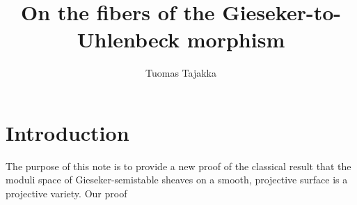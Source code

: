 \documentclass[letterpaper,10pt]{article}
\title{On the fibers of the Gieseker-to-Uhlenbeck morphism}
\author{Tuomas Tajakka}
\date{}
\theoremstyle{remark}
\begin{document}
\maketitle

\section{Introduction}
The purpose of this note is to provide a new proof of the classical result that the moduli space of Gieseker-semistable sheaves on a smooth, projective surface is a projective variety. Our proof 



\end{document}

